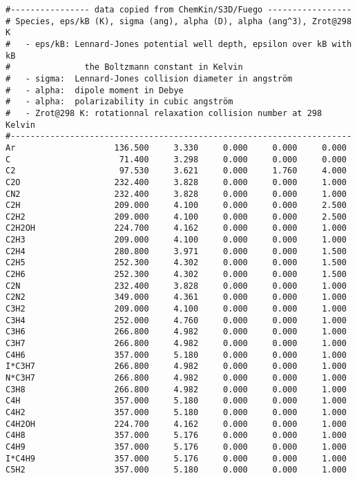 \linenumbers*
\begin{verbatim}
#---------------- data copied from ChemKin/S3D/Fuego -----------------
# Species, eps/kB (K), sigma (ang), alpha (D), alpha (ang^3), Zrot@298 K
#   - eps/kB: Lennard-Jones potential well depth, epsilon over kB with kB 
#               the Boltzmann constant in Kelvin
#   - sigma:  Lennard-Jones collision diameter in angström
#   - alpha:  dipole moment in Debye
#   - alpha:  polarizability in cubic angström
#   - Zrot@298 K: rotationnal relaxation collision number at 298 Kelvin
#---------------------------------------------------------------------
Ar                    136.500     3.330     0.000     0.000     0.000
C                      71.400     3.298     0.000     0.000     0.000
C2                     97.530     3.621     0.000     1.760     4.000
C2O                   232.400     3.828     0.000     0.000     1.000
CN2                   232.400     3.828     0.000     0.000     1.000
C2H                   209.000     4.100     0.000     0.000     2.500
C2H2                  209.000     4.100     0.000     0.000     2.500
C2H2OH                224.700     4.162     0.000     0.000     1.000
C2H3                  209.000     4.100     0.000     0.000     1.000
C2H4                  280.800     3.971     0.000     0.000     1.500
C2H5                  252.300     4.302     0.000     0.000     1.500
C2H6                  252.300     4.302     0.000     0.000     1.500
C2N                   232.400     3.828     0.000     0.000     1.000
C2N2                  349.000     4.361     0.000     0.000     1.000
C3H2                  209.000     4.100     0.000     0.000     1.000
C3H4                  252.000     4.760     0.000     0.000     1.000
C3H6                  266.800     4.982     0.000     0.000     1.000
C3H7                  266.800     4.982     0.000     0.000     1.000
C4H6                  357.000     5.180     0.000     0.000     1.000
I*C3H7                266.800     4.982     0.000     0.000     1.000
N*C3H7                266.800     4.982     0.000     0.000     1.000
C3H8                  266.800     4.982     0.000     0.000     1.000
C4H                   357.000     5.180     0.000     0.000     1.000
C4H2                  357.000     5.180     0.000     0.000     1.000
C4H2OH                224.700     4.162     0.000     0.000     1.000
C4H8                  357.000     5.176     0.000     0.000     1.000
C4H9                  357.000     5.176     0.000     0.000     1.000
I*C4H9                357.000     5.176     0.000     0.000     1.000
C5H2                  357.000     5.180     0.000     0.000     1.000

\end{verbatim}
